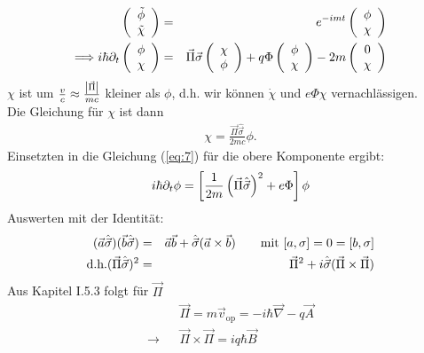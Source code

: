 \begin{eqnarray*}\nonumber
\left(\begin{array} c \tilde \phi \\ \tilde \chi \end{array}\ri ) \g e^{-imt} \left(\begin{array}{c}\phi\\ \chi \end{array}\ri)\\\label{eq:7}
\Longrightarrow i\hbar\partial_t\left(\begin{array} c \phi \\ \chi \end{array}\ri) \g \vec \Pi \vec \sigma \left(\begin{array}c \chi\\\phi\end{array}\ri) + q \Phi \left(\begin{array}c \phi\\ \chi\end{array}\ri) - 2 m \left(\begin{array}c 0 \\ \chi\end{array}\ri)
\end{eqnarray*}
$\chi$ ist um $\frac v c \approx  \frac{\left|\vec \Pi\right|}{m c}$ kleiner als $\phi$, d.h. wir können $\dot \chi$ und $e \Phi \chi$ vernachlässigen.\\
Die Gleichung für $\chi$ ist dann
\begin{eqnarray*}
\chi = \frac{\vec\Pi\hat{\vec \sigma}}{2mc}\phi.
\end{eqnarray*}
Einsetzten in die Gleichung (\ref{eq:7}) für die obere Komponente ergibt:
\begin{eqnarray*}
i\hbar \partial_t \phi  = \left[ \frac{1}{2m} \left(\vec \Pi \hat{\vec\sigma}\right)^2 + e \Phi \right] \phi
\end{eqnarray*}
Auswerten mit der Identität:
\begin{eqnarray*}
(\vec a \hat{\vec \sigma})(\vec b \hat{\vec \sigma}) &=& \vec a\vec b + \hat{\vec \sigma}(\vec a \times \vec b)\qquad \text{mit }[a,\sigma] = 0 = [b, \sigma]\\
\text{d.h.} (\vec \Pi\hat{\vec \sigma})^2 &=& \vec \Pi^2 + i \hat{\vec \sigma}(\vec \Pi\times\vec\Pi)
\end{eqnarray*}
Aus Kapitel I.5.3 folgt für $\vec \Pi$
\begin{eqnarray*}
&{}&\vec \Pi = m \vec v_{\text{op}} = -i\hbar \vec \nabla - q \vec A\\
\rightarrow &{}& \vec \Pi \times \vec \Pi = i q \hbar \vec B
\end{eqnarray*}
